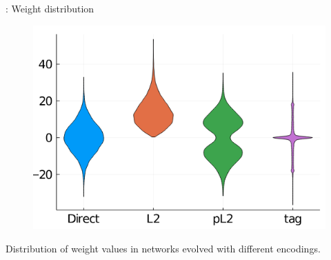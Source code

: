 \begin{frame}{\tciii{} \gene: Weight distribution}
    
    \begin{figure}
    \centering
    \includegraphics[width=.7\linewidth]{images/GENE/images/weights_distrib.png}
\end{figure}
\begin{center}
    \small Distribution of weight values in networks evolved with different encodings.
\end{center}
\end{frame}

